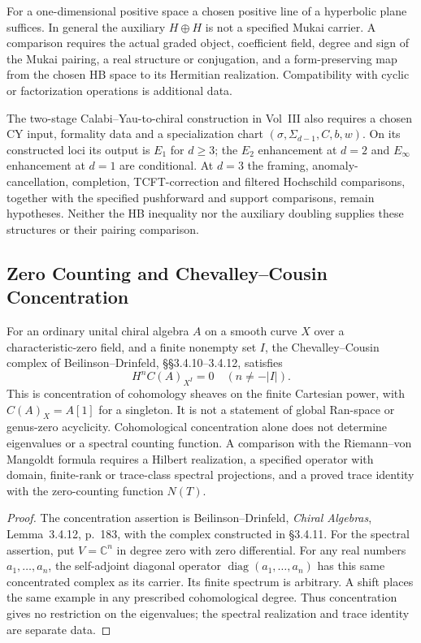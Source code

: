 \begin{remark}
\label{v4-arith:w6-i:rem:W5-J-signature}
For a one-dimensional positive space a chosen positive line of a
hyperbolic plane suffices. In general the auxiliary $H\oplus H$
is not a specified Mukai carrier. A comparison requires the actual
graded object, coefficient field, degree and sign of the Mukai
pairing, a real structure or conjugation, and a form-preserving map
from the chosen HB space to its Hermitian realization. Compatibility
with cyclic or factorization operations is additional data.

The two-stage Calabi--Yau-to-chiral construction in Vol~III also
requires a chosen CY input, formality data and a specialization
chart $(\sigma,\Sigma_{d-1},C,b,w)$. On its constructed loci its
output is $E_1$ for $d\geq3$; the $E_2$ enhancement at $d=2$ and
$E_\infty$ enhancement at $d=1$ are conditional. At $d=3$ the
framing, anomaly-cancellation, completion, TCFT-correction and
filtered Hochschild comparisons, together with the specified
pushforward and support comparisons, remain hypotheses.
Neither the HB inequality nor the auxiliary doubling supplies
these structures or their pairing comparison.
\end{remark}

\subsection{Zero Counting and Chevalley--Cousin Concentration}
\label{v4-arith:w6-i:W5-I-alignment}

\begin{proposition}
\label{v4-arith:w6-i:thm:W5-I-orthogonal}
For an ordinary unital chiral algebra $A$ on a smooth curve $X$
over a characteristic-zero field, and a finite
nonempty set $I$, the Chevalley--Cousin complex of
Beilinson--Drinfeld, \S\S3.4.10--3.4.12, satisfies
\[
 H^n C(A)_{X^I}=0\quad(n\ne-|I|).
\]
This is concentration of cohomology sheaves on the finite Cartesian
power, with $C(A)_X=A[1]$ for a singleton. It is not a statement
of global Ran-space or genus-zero acyclicity.
Cohomological concentration alone does not determine eigenvalues
or a spectral counting function. A comparison with the
Riemann--von Mangoldt formula requires a Hilbert realization, a
specified operator with domain, finite-rank or trace-class spectral
projections, and a proved trace identity with the zero-counting
function $N(T)$.
\end{proposition}
\begin{proof}
The concentration assertion is Beilinson--Drinfeld,
\emph{Chiral Algebras}, Lemma~3.4.12, p.~183, with the complex
constructed in \S3.4.11. For the spectral assertion, put
$V=\mathbb C^n$ in degree zero with zero differential. For any
real numbers $a_1,\ldots,a_n$, the self-adjoint diagonal operator
$\operatorname{diag}(a_1,\ldots,a_n)$ has this same concentrated
complex as its carrier. Its finite spectrum is arbitrary. A
shift places the same example in any prescribed cohomological
degree. Thus concentration gives no restriction on the eigenvalues;
the spectral realization and trace identity are separate data.
\end{proof}

